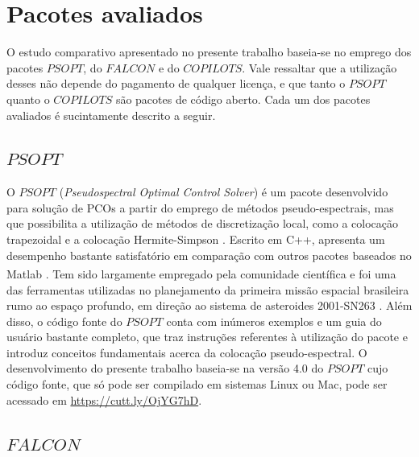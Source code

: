   

\section{Pacotes avaliados}

O estudo comparativo apresentado no presente trabalho baseia-se no emprego dos pacotes $ PSOPT $, do $ FALCON $ e do $ COPILOTS $. Vale ressaltar que a utilização desses não depende do pagamento de qualquer licença, e que tanto o $ PSOPT $ quanto o $ COPILOTS $ são pacotes de código aberto. Cada um dos pacotes avaliados é sucintamente descrito a seguir. 

\subsection{\boldmath$ PSOPT $}

O $ PSOPT $ (\textit{Pseudospectral Optimal Control Solver}) é um pacote desenvolvido para solução de PCOs a partir do emprego de métodos pseudo-espectrais, mas que possibilita a utilização de métodos de discretização local, como a colocação trapezoidal e a colocação Hermite-Simpson \cite{becerra_psopt_2019}. Escrito em C++, apresenta um desempenho bastante satisfatório em comparação com outros pacotes baseados no Matlab\textsuperscript{\textregistered} \cite{becerra_psopt_2010}. Tem sido largamente empregado pela comunidade científica e foi uma das ferramentas utilizadas no planejamento da primeira missão espacial brasileira rumo ao espaço profundo, em direção ao sistema de asteroides 2001-SN263 \cite{becerra_psopt_2010}. Além disso, o código fonte do $ PSOPT $ conta com inúmeros exemplos e um guia do usuário bastante completo, que traz instruções referentes à utilização do pacote e introduz conceitos fundamentais acerca da colocação pseudo-espectral. O desenvolvimento do presente trabalho baseia-se na versão 4.0 do $ PSOPT $ cujo código fonte, que só pode ser compilado em sistemas Linux ou Mac, pode ser acessado em \url{https://cutt.ly/OjYG7hD}.

\subsection{\boldmath$ FALCON $}

